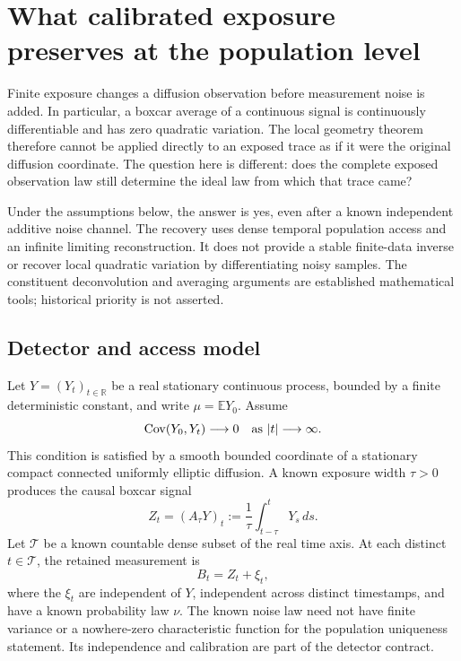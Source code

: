 \chapter{What calibrated exposure preserves at the population level}
\label{ch:dg-recovery}

Finite exposure changes a diffusion observation before measurement noise is
added. In particular, a boxcar average of a continuous signal is continuously
differentiable and has zero quadratic variation. The local geometry theorem
therefore cannot be applied directly to an exposed trace as if it were the
original diffusion coordinate. The question here is different: does the
complete exposed observation law still determine the ideal law from which
that trace came?

Under the assumptions below, the answer is yes, even after a known independent
additive noise channel. The recovery uses dense temporal population access
and an infinite limiting reconstruction. It does not provide a stable
finite-data inverse or recover local quadratic variation by differentiating
noisy samples. The constituent deconvolution and averaging arguments are
established mathematical tools; historical priority is not asserted.

\section{Detector and access model}

Let $Y=(Y_t)_{t\in\mathbb R}$ be a real stationary continuous process,
bounded by a finite deterministic constant, and write $\mu=\mathbb E Y_0$.
Assume
\begin{equation}
 \operatorname{Cov}(Y_0,Y_t)\longrightarrow0
 \quad\hbox{as }|t|\longrightarrow\infty.
 \label{eq:dg-covariance-mixing}
\end{equation}
This condition is satisfied by a smooth bounded coordinate of a stationary
compact connected uniformly elliptic diffusion. A known exposure width
$\tau>0$ produces the causal boxcar signal
\begin{equation}
 Z_t=(A_\tau Y)_t
      :=\frac1\tau\int_{t-\tau}^tY_s\,ds.
 \label{eq:dg-exposure}
\end{equation}
Let $\mathcal T$ be a known countable dense subset of the real time axis.
At each distinct $t\in\mathcal T$, the retained measurement is
\begin{equation}
 B_t=Z_t+\xi_t,
 \label{eq:dg-readout}
\end{equation}
where the $\xi_t$ are independent of $Y$, independent across distinct
timestamps, and have a known probability law $\nu$. The known noise law
need not have finite variance or a nowhere-zero characteristic function for
the population uniqueness statement. Its independence and calibration are
part of the detector contract.

